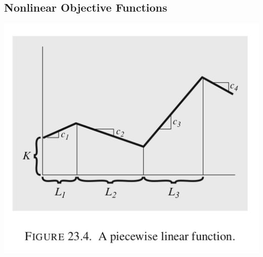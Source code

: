 \documentclass[11pt]{article}
\begin{document}
\subsection{Nonlinear Objective Functions}
\label{sec:org125aff5}
\begin{center}
\includegraphics[width=.9\linewidth]{Integer Programming/screenshot_2019-02-17_10-28-30.png}
\end{center}
\end{document}
